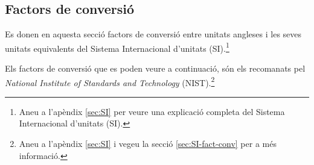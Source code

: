 \subsection{Factors de conversió}

Es donen en aquesta secció factors de conversió entre unitats angleses i les seves unitats equivalents del Sistema Internacional d'unitats (SI).\footnote{Aneu a l'apèndix \ref{sec:SI} per veure una explicació completa del Sistema Internacional d'unitats (SI).}

Els factors de conversió que es poden veure a continuació, són els recomanats pel \textit{National Institute of Standards and Technology} (NIST).\footnote{Aneu a l'apèndix \ref{sec:SI} i vegeu la secció \ref{sec:SI-fact-conv} per a més informació.}

